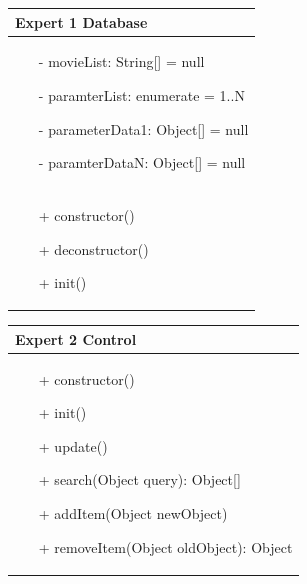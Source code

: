 \documentclass[]{article}
\begin{document}
\begin{table}[H]
\centering
\begin{tabular}{|>{\centering\arraybackslash}p{10cm}|}
\hline
Expert 1 Database\\
\hline
\begin{itemize}
\item[-] movieList: String[] = null
\item[-] paramterList: enumerate = 1..N
\item[-] parameterData1: Object[] = null
\item[-] paramterDataN: Object[] = null
\end{itemize}
\\
\hline
\begin{itemize}
\item[+] constructor()
\item[+] deconstructor()
\item[+] init()
\end{itemize}
\\
\hline
\end{tabular}
\end{table}
%
\begin{table}[H]
\centering
\begin{tabular}{|>{\centering\arraybackslash}p{10cm}|}
\hline
Expert 2 Control\\
\hline
\begin{itemize}
\item[+] constructor()
\item[+] init()
\item[+] update()
\item[+] search(Object query): Object[]
\item[+] addItem(Object newObject)
\item[+] removeItem(Object oldObject): Object
\end{itemize}
\\
\hline
\end{tabular}
\end{table}
%
\end{document}
